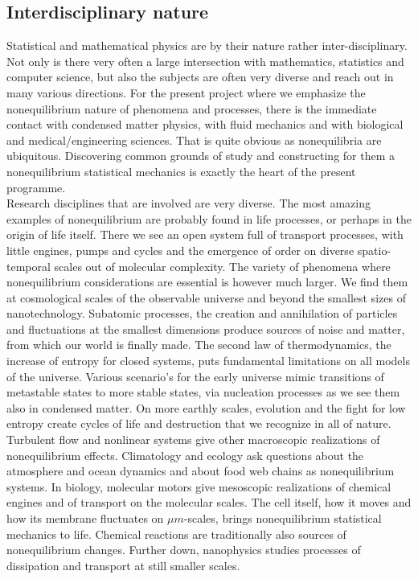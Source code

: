 \subsection{Interdisciplinary nature}\label{sec:interdisc}

Statistical and mathematical physics are by their nature rather inter-disciplinary.  Not only is there very often a large intersection with mathematics, statistics and computer science, but also the subjects are often very diverse and reach out in many various directions.  For the present project where we emphasize the nonequilibrium nature of phenomena and processes, there is the immediate contact with condensed matter physics, with fluid mechanics and with biological and medical/engineering sciences.  That is quite obvious as nonequilibria are ubiquitous.  Discovering common grounds of study and constructing for them a nonequilibrium statistical mechanics is exactly the heart of the present programme.\\
Research disciplines that are involved are very diverse. The most amazing examples of nonequilibrium are probably found in life processes, or perhaps in the origin of life itself.  There we see an open system full of transport processes, with little engines, pumps and cycles and the emergence of order on diverse spatio-temporal scales out of molecular complexity. The variety of phenomena where nonequilibrium considerations are essential is however much larger.  We find them at cosmological scales of the observable universe  and beyond the smallest sizes of nanotechnology.  Subatomic processes, the creation and annihilation of particles and fluctuations at the smallest dimensions produce sources of noise and matter, from which our world is finally made.  The second law of thermodynamics, the increase of entropy for closed systems, puts fundamental limitations on all models of the universe.  Various scenario's for the early universe  mimic transitions of metastable states to more   stable states, via
 nucleation processes as we see them also  in condensed matter.  On more earthly scales, evolution and the fight for low entropy create cycles of life and destruction that we recognize in all of nature.    Turbulent
  flow and nonlinear systems give other macroscopic realizations of nonequilibrium effects.   Climatology and ecology ask questions about the atmosphere and ocean dynamics and about food web chains as  nonequilibrium systems.
  In biology, molecular motors   give mesoscopic realizations of chemical engines and of transport on the molecular scales.   The cell itself, how it moves and how its membrane fluctuates on $\mu m$-scales, brings nonequilibrium statistical mechanics to life.   Chemical reactions are traditionally also sources of nonequilibrium changes.
 Further down, nanophysics studies processes of dissipation and transport at still smaller scales.




